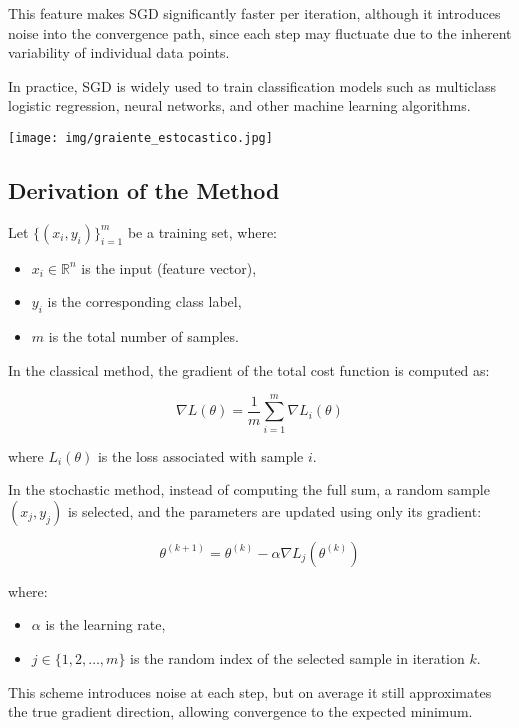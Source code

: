 \documentclass[12pt, letterpaper,conference]{IEEEtran}
\begin{document}
This feature makes SGD significantly faster per iteration, although it introduces noise into the convergence path, since each step may fluctuate due to the inherent variability of individual data points.

In practice, SGD is widely used to train classification models such as multiclass logistic regression, neural networks, and other machine learning algorithms.

\vspace{0.3cm}

\texttt{[image: img/graiente\_estocastico.jpg]}

\vspace{0.25cm}

\subsection{Derivation of the Method}

Let \( \{ (x_i, y_i) \}_{i=1}^{m} \) be a training set, where:
\begin{itemize}
    \item \( x_i \in \mathbb{R}^n \) is the input (feature vector),
    \item \( y_i \) is the corresponding class label,
    \item \( m \) is the total number of samples.
\end{itemize}

In the classical method, the gradient of the total cost function is computed as:

\[
\nabla L(\theta) = \frac{1}{m} \sum_{i=1}^{m} \nabla L_i(\theta)
\]

where \( L_i(\theta) \) is the loss associated with sample \( i \).

In the stochastic method, instead of computing the full sum, a random sample \( (x_j, y_j) \) is selected, and the parameters are updated using only its gradient:

\[
\theta^{(k+1)} = \theta^{(k)} - \alpha \nabla L_j(\theta^{(k)})
\]

where:
\begin{itemize}
    \item \( \alpha \) is the learning rate,
    \item \( j \in \{1, 2, \dots, m\} \) is the random index of the selected sample in iteration \( k \).
\end{itemize}

This scheme introduces noise at each step, but on average it still approximates the true gradient direction, allowing convergence to the expected minimum.
\end{document}
